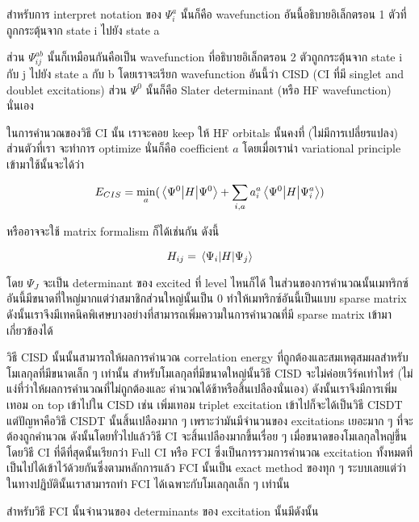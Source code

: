 สำหรับการ interpret notation ของ $\Psi^{a}_{i}$ นั้นก็คือ wavefunction อันนี้อธิบายอิเล็กตรอน 1
ตัวที่ถูกกระตุ้นจาก state i ไปยัง state a

ส่วน $\Psi^{ab}_{ij}$ นั้นก็เหมือนกันคือเป็น wavefunction ที่อธิบายอิเล็กตรอน 2 ตัวถูกกระตุ้นจาก
state i กับ j ไปยัง state a กับ b โดยเราจะเรียก wavefunction อันนี้ว่า CISD (CI ที่มี singlet
and doublet excitations) ส่วน $\Psi^{0}$ นั้นก็คือ Slater determinant (หรือ HF wavefunction)
นั่นเอง

ในการคำนวณของวิธี CI นั้น เราจะคอย keep ให้ HF orbitals นั้นคงที่ (ไม่มีการเปลี่ยรแปลง) ส่วนตัวที่เรา%
จะทำการ optimize นั่นก็คือ coefficient $a$ โดยเมื่อเรานำ variational principle เข้ามาใช้นั้นจะได้ว่า

\begin{equation}
    E_{CIS} = \min_{a} ( \mel{\Psi^{0}}{H}{\Psi^{0}}
    + \sum_{i,a} a^{a}_{i} \mel{\Psi^{0}}{H}{\Psi^{a}_{i}} )
\end{equation}

\noindent หรืออาจจะใช้ matrix formalism ก็ได้เช่นกัน ดังนี้

\begin{equation}
    H_{ij} = \mel{\Psi_{i}}{H}{\Psi_{j}}
\end{equation}

โดย $\Psi_{J}$ จะเป็น determinant ของ excited ที่ level ไหนก็ได้ ในส่วนของการคำนวณนั้นเมทริกซ์%
อันนี้มีขนาดที่ใหญ่มากแต่ว่าสมาชิกส่วนใหญ่นั้นเป็น 0 ทำให้เมทริกซ์อันนี้เป็นแบบ sparse matrix
ดังนั้นเราจึงมีเทคนิคพิเศษบางอย่างที่สามารถเพิ่มความในการคำนวณที่มี sparse matrix เข้ามาเกี่ยวข้องได้

วิธี CISD นั้นนั้นสามารถให้ผลการคำนวณ correlation energy ที่ถูกต้องและสมเหตุสมผลสำหรับโมเลกุลที่มีขนาดเล็ก ๆ
เท่านั้น สำหรับโมเลกุลที่มีขนาดใหญ่นั้นวิธี CISD จะไม่ค่อยเวิร์คเท่าไหร่ (ไม่แง่ที่ว่าให้ผลการคำนวณที่ไม่ถูกต้องและ%
คำนวณได้ช้าหรือสิ้นเปลืองนั่นเอง) ดังนั้นเราจึงมีการเพิ่มเทอม on top เข้าไปใน CISD เช่น เพิ่มเทอม triplet
excitation เข้าไปก็จะได้เป็นวิธี CISDT แต่ปัญหาคือวิธี CISDT นั้นสิ้นเปลืองมาก ๆ เพราะว่ามันมีจำนวนของ
excitations เยอะมาก ๆ ที่จะต้องถูกคำนวณ ดังนั้นโดยทั่วไปแล้ววิธี CI จะสิ้นเปลืองมากขึ้นเรื่อย ๆ
เมื่อขนาดของโมเลกุลใหญ่ขึ้น โดยวิธี CI ที่ดีที่สุดนั้นเรียกว่า Full CI หรือ FCI ซึ่งเป็นการรวมการคำนวณ
excitation ทั้งหมดที่เป็นไปได้เข้าไว้ด้วยกันซึ่งตามหลักการแล้ว FCI นั้นเป็น exact method ของทุก ๆ
ระบบเลยแต่ว่าในทางปฏิบัตินั้นเราสามารถทำ FCI ได้เฉพาะกับโมเลกุลเล็ก ๆ เท่านั้น

สำหรับวิธี FCI นั้นจำนวนของ determinants ของ excitation นั้นมีดังนั้น

